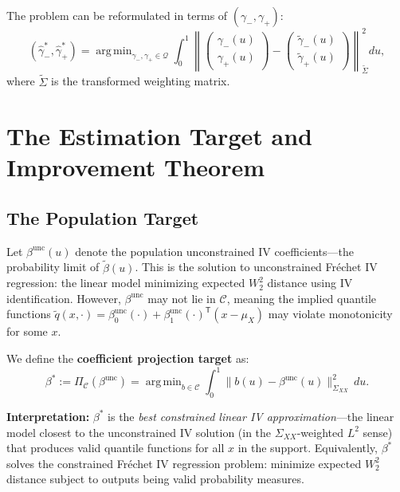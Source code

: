 \documentclass[12pt]{article}
\newcommand{\T}{\mathsf{T}}
\DeclareMathOperator*{\argmin}{arg\,min}
\newcommand{\calQ}{\mathcal{Q}}
\begin{document}
The problem can be reformulated in terms of $(\gamma_-, \gamma_+)$:
\begin{equation}
(\hat{\gamma}_-^*, \hat{\gamma}_+^*) = \argmin_{\gamma_-, \gamma_+ \in \calQ} \int_0^1 \left\| \begin{pmatrix} \gamma_-(u) \\ \gamma_+(u) \end{pmatrix} - \begin{pmatrix} \tilde{\gamma}_-(u) \\ \tilde{\gamma}_+(u) \end{pmatrix} \right\|_{\tilde{\Sigma}}^2 du,
\end{equation}
where $\tilde{\Sigma}$ is the transformed weighting matrix.

\section{The Estimation Target and Improvement Theorem}

\subsection{The Population Target}

Let $\beta^{\text{unc}}(u)$ denote the population unconstrained IV coefficients---the probability limit of $\tilde{\beta}(u)$. This is the solution to unconstrained Fréchet IV regression: the linear model minimizing expected $W_2^2$ distance using IV identification. However, $\beta^{\text{unc}}$ may not lie in $\mathcal{C}$, meaning the implied quantile functions $\tilde{q}(x, \cdot) = \beta_0^{\text{unc}}(\cdot) + \beta_1^{\text{unc}}(\cdot)^\T(x - \mu_X)$ may violate monotonicity for some $x$.

We define the \textbf{coefficient projection target} as:
\begin{equation}\label{eq:target}
\beta^* := \Pi_{\mathcal{C}}(\beta^{\text{unc}}) = \argmin_{b \in \mathcal{C}} \int_0^1 \|b(u) - \beta^{\text{unc}}(u)\|_{\Sigma_{XX}}^2 \, du.
\end{equation}

\textbf{Interpretation:} $\beta^*$ is the \emph{best constrained linear IV approximation}---the linear model closest to the unconstrained IV solution (in the $\Sigma_{XX}$-weighted $L^2$ sense) that produces valid quantile functions for all $x$ in the support. Equivalently, $\beta^*$ solves the constrained Fréchet IV regression problem: minimize expected $W_2^2$ distance subject to outputs being valid probability measures.
\end{document}
